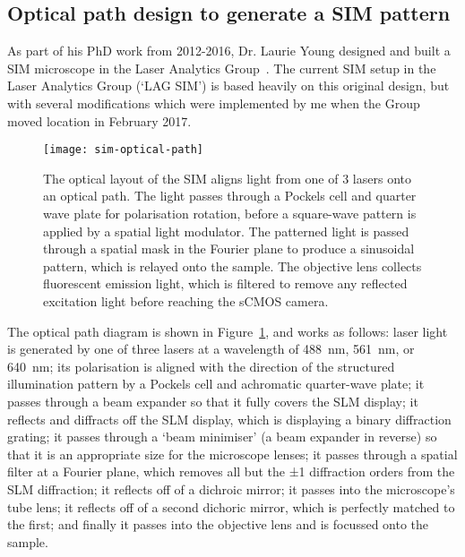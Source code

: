 \subsection{Optical path design to generate a SIM pattern} \label{sec:lagsim-path}
As part of his PhD work from 2012-2016, Dr. Laurie Young designed and built a SIM microscope in the Laser Analytics Group~\cite{young2016guide}. 
The current SIM setup in the Laser Analytics Group (`LAG SIM') is based heavily on this original design, but with several modifications which were implemented by me when the Group moved location in February 2017. 

\begin{figure}[p]
\centering
\texttt{[image: sim-optical-path]}
\caption[LAG SIM: Optics pattern laser light with a SIM pattern and apply polarisation rotation for optical sectioning and resolution enhancement]{The optical layout of the SIM aligns light from one of 3 lasers onto an optical path. The light passes through a Pockels cell and quarter wave plate for polarisation rotation, before a square-wave pattern is applied by a spatial light modulator. The patterned light is passed through a spatial mask in the Fourier plane to produce a sinusoidal pattern, which is relayed onto the sample. The objective lens collects fluorescent emission light,  which is filtered to remove any reflected excitation light before reaching the sCMOS camera.}
\label{fig:SIMpath}
\end{figure}

The optical path diagram is shown in Figure~\ref{fig:SIMpath}, and works as follows: laser light is generated by one of three lasers at a wavelength of \SI{488}{\nano\metre}, \SI{561}{\nano\metre}, or \SI{640}{\nano\metre}; its polarisation is aligned with the direction of the structured illumination pattern by a Pockels cell and achromatic quarter-wave plate; it passes through a beam expander so that it fully covers the SLM display; it reflects and diffracts off the SLM display, which is displaying a binary diffraction grating; it passes through a `beam minimiser' (a beam expander in reverse) so that it is an appropriate size for the microscope lenses; it passes through a spatial filter at a Fourier plane, which removes all but the ±1 diffraction orders from the SLM diffraction; it reflects off of a dichroic mirror; it passes into the microscope's tube lens; it reflects off of a second dichoric mirror, which is perfectly matched to the first; and finally it passes into the objective lens and is focussed onto the sample. 

